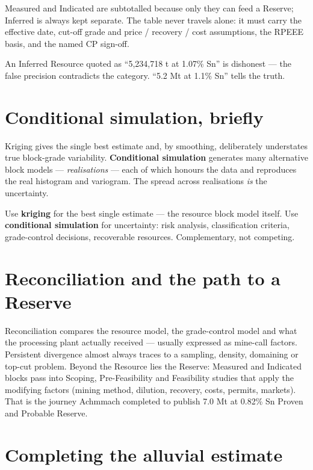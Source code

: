 \documentclass[11pt]{article}
\begin{document}
Measured and Indicated are subtotalled because only they can feed a
Reserve; Inferred is always kept separate. The table never travels
alone: it must carry the effective date, cut-off grade and price /
recovery / cost assumptions, the RPEEE basis, and the named CP sign-off.

\begin{keybox}
An Inferred Resource quoted as ``5,234,718 t at 1.07\% Sn'' is
dishonest --- the false precision contradicts the category. ``5.2 Mt at
1.1\% Sn'' tells the truth.
\end{keybox}

\section{Conditional simulation, briefly}

Kriging gives the single best estimate and, by smoothing, deliberately
understates true block-grade variability. \textbf{Conditional simulation}
generates many alternative block models --- \emph{realisations} ---
each of which honours the data and reproduces the real histogram and
variogram. The spread across realisations \emph{is} the uncertainty.

\begin{notebox}
Use \textbf{kriging} for the best single estimate --- the resource block
model itself. Use \textbf{conditional simulation} for uncertainty: risk
analysis, classification criteria, grade-control decisions, recoverable
resources. Complementary, not competing.
\end{notebox}

\section{Reconciliation and the path to a Reserve}

Reconciliation compares the resource model, the grade-control model and
what the processing plant actually received --- usually expressed as
mine-call factors. Persistent divergence almost always traces to a
sampling, density, domaining or top-cut problem. Beyond the Resource lies
the Reserve: Measured and Indicated blocks pass into Scoping,
Pre-Feasibility and Feasibility studies that apply the modifying factors
(mining method, dilution, recovery, costs, permits, markets). That is
the journey Achmmach completed to publish 7.0 Mt at 0.82\% Sn Proven and
Probable Reserve.

\section{Completing the alluvial estimate}
\end{document}
